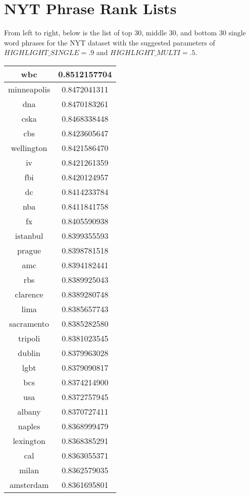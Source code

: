 \documentclass{article}
\begin{document}
\section*{NYT Phrase Rank Lists}
From left to right, below is the list of top 30, middle 30, and bottom 30 single word phrases for the NYT dataset with the suggested parameters of $HIGHLIGHT\_SINGLE=.9$ and $HIGHLIGHT\_MULTI=.5$.\\
\begin{table}[ht]
\parbox{.22\linewidth}{
\centering
\begin{tabular}{|c|c|}
\hline
wbc & 0.8512157704 \\
\hline
minneapolis & 0.8472041311 \\
\hline
dna & 0.8470183261 \\
\hline
cska & 0.8468338448 \\
\hline
cbs & 0.8423605647 \\
\hline
wellington & 0.8421586470 \\
\hline
iv & 0.8421261359 \\
\hline
fbi & 0.8420124957 \\
\hline
dc & 0.8414233784 \\
\hline
nba & 0.8411841758 \\
\hline
fx & 0.8405590938 \\
\hline
istanbul & 0.8399355593 \\
\hline
prague & 0.8398781518 \\
\hline
amc & 0.8394182441 \\
\hline
rbs & 0.8389925043 \\
\hline
clarence & 0.8389280748 \\
\hline
lima & 0.8385657743 \\
\hline
sacramento & 0.8385282580 \\
\hline
tripoli & 0.8381023545 \\
\hline
dublin & 0.8379963028 \\
\hline
lgbt & 0.8379090817 \\
\hline
bcs & 0.8374214900 \\
\hline
usa & 0.8372757945 \\
\hline
albany & 0.8370727411 \\
\hline
naples & 0.8368999479 \\
\hline
lexington & 0.8368385291 \\
\hline
cal & 0.8363055371 \\
\hline
milan & 0.8362579035 \\
\hline
amsterdam & 0.8361695801 \\

\end{tabular}}
\end{table}
\end{document}
